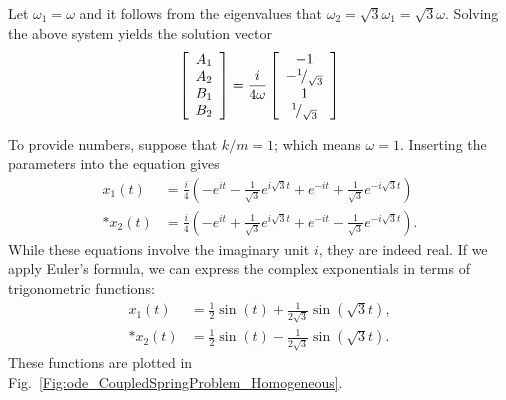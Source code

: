 Let $\omega_1 = \omega$ and it follows from the eigenvalues that $\omega_2 = \sqrt{3} \omega_1 = \sqrt{3} \omega$. Solving the above system yields the solution vector
\begin{align}
  \left[ \begin{array}{c} A_1 \\ A_2 \\ B_1 \\ B_2 \\ \end{array} \right] =
  \frac{i}{4 \omega} \left[ \begin{array}{c} -1 \\ -{}^{1}\!/_{\sqrt{3}} \\ 1 \\ {}^{1}\!/_{\sqrt{3}} \\ \end{array} \right]
\end{align}

To provide numbers, suppose that $k/m = 1$; which means $\omega = 1$. Inserting the parameters into the equation gives
\begin{subequations}
\begin{align}
  x_1(t) &= \frac{i}{4} \left( -e^{i  t} - \frac{1}{\sqrt{3}} e^{i \sqrt{3} t} + e^{-i  t} + \frac{1}{\sqrt{3}} e^{-i \sqrt{3} t} \right) \\*
  x_2(t) &= \frac{i}{4} \left( -e^{i  t} + \frac{1}{\sqrt{3}} e^{i \sqrt{3} t} + e^{-i  t} - \frac{1}{\sqrt{3}} e^{-i \sqrt{3} t} \right) .
\end{align}
\end{subequations}
While these equations involve the imaginary unit $i$, they are indeed real. If we apply Euler's formula, we can express the complex exponentials in terms of trigonometric functions:
\begin{subequations}
\begin{align}
  x_1(t) &= \frac{1}{2} \sin( t ) + \frac{ 1 }{ 2 \sqrt{3} }  \sin( \sqrt{3} t ) , \\*
  x_2(t) &= \frac{1}{2} \sin( t ) - \frac{ 1 }{ 2 \sqrt{3} }  \sin( \sqrt{3} t ) .
\end{align}
\end{subequations}
These functions are plotted in Fig.~\ref{Fig:ode_CoupledSpringProblem_Homogeneous}. 

